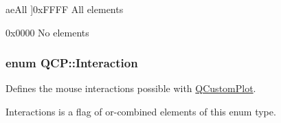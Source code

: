 \begin{Desc}
\begin{description}
{\hypertarget{namespaceQCP_ae55dbe315d41fe80f29ba88100843a0caa897c232a0ffc8368e7c100ffc59ef31}{}ae\+All\label{namespaceQCP_ae55dbe315d41fe80f29ba88100843a0caa897c232a0ffc8368e7c100ffc59ef31}
}]{\ttfamily 0x\+F\+F\+F\+F} All elements \item[{\em 
\hypertarget{namespaceQCP_ae55dbe315d41fe80f29ba88100843a0caa9e90d81896358757d94275aeaa58f6a}{}ae\+None\label{namespaceQCP_ae55dbe315d41fe80f29ba88100843a0caa9e90d81896358757d94275aeaa58f6a}
}]{\ttfamily 0x0000} No elements \end{description}
\end{Desc}
\hypertarget{namespaceQCP_a2ad6bb6281c7c2d593d4277b44c2b037}{}
\subsubsection[{Interaction}]{\setlength{\rightskip}{0pt plus 5cm}enum {\bf Q\+C\+P\+::\+Interaction}}\label{namespaceQCP_a2ad6bb6281c7c2d593d4277b44c2b037}


Defines the mouse interactions possible with \hyperlink{classQCustomPlot}{Q\+Custom\+Plot}. 

{\ttfamily Interactions} is a flag of or-\/combined elements of this enum type.

